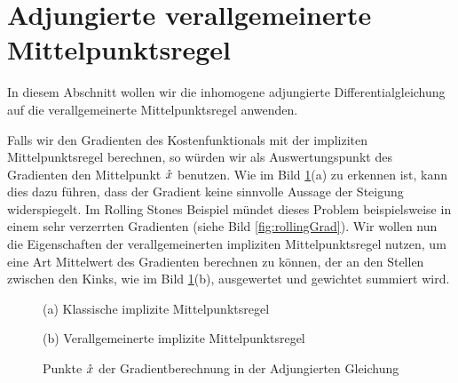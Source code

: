 \section{Adjungierte verallgemeinerte Mittelpunktsregel}

In diesem Abschnitt wollen wir die inhomogene adjungierte Differentialgleichung auf die verallgemeinerte Mittelpunktsregel anwenden.

Falls wir den Gradienten des Kostenfunktionals mit der impliziten Mittelpunktsregel berechnen, so würden wir als Auswertungspunkt des Gradienten den Mittelpunkt $\mathring{x}$ benutzen. Wie im Bild \ref{fig:multipleKinksAdjoint}(a) zu erkennen ist, kann dies dazu führen, dass der Gradient keine sinnvolle Aussage der Steigung widerspiegelt. Im Rolling Stones Beispiel mündet dieses Problem beispielsweise in einem sehr verzerrten Gradienten (siehe Bild \ref{fig:rollingGrad}). Wir wollen nun die Eigenschaften der verallgemeinerten impliziten Mittelpunktsregel nutzen, um eine Art Mittelwert des Gradienten berechnen zu können, der an den Stellen zwischen den Kinks, wie im Bild \ref{fig:multipleKinksAdjoint}(b), ausgewertet und gewichtet summiert wird. 

\begin{figure}
\footnotesize
\centering
\begin{minipage}[b]{\linewidth}

\caption*{(a) Klassische implizite Mittelpunktsregel}
\end{minipage}
\begin{minipage}[b]{\linewidth}

\caption*{(b) Verallgemeinerte implizite Mittelpunktsregel}
\end{minipage}
\caption{Punkte $\mathring{x}$ der Gradientberechnung in der Adjungierten Gleichung}
\label{fig:multipleKinksAdjoint}
\end{figure}


